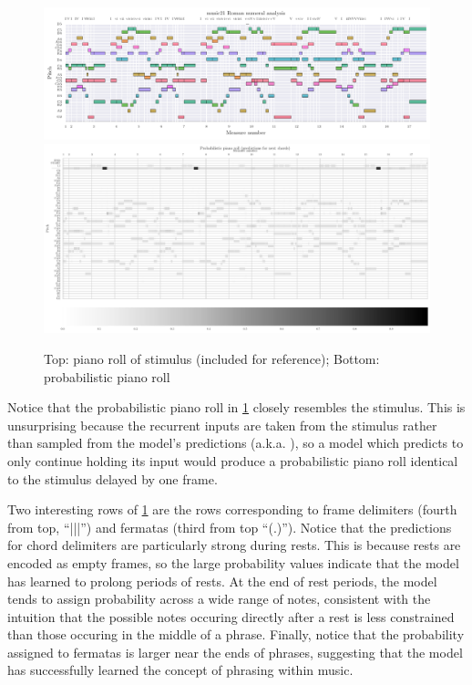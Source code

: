 \begin{figure}[tb]
    \centering
    ~~\includegraphics[width=0.99\linewidth]{model-analysis-input-piano-roll.pdf}
    \includegraphics[trim={0 0 0 1.4cm},clip,width=1.0\linewidth]{model-analysis-probabilistic-piano-roll.pdf}
    \caption{Top: piano roll of stimulus (included for reference); Bottom: probabilistic piano roll}
    \label{fig:model-analysis-probabilistic-piano-roll}
\end{figure}

Notice that the probabilistic piano roll in
\cref{fig:model-analysis-probabilistic-piano-roll} closely resembles the
stimulus. This is unsurprising because the recurrent inputs are taken from the
stimulus rather than sampled from the model's predictions (a.k.a.
\citep{williams1989learning}), so a model which predicts to only continue holding
its input would produce a probabilistic piano roll identical to the stimulus
delayed by one frame.

Two interesting rows of \cref{fig:model-analysis-probabilistic-piano-roll}
are the rows corresponding to frame delimiters (fourth from top, ``|||'') and
fermatas (third from top ``(.)''). Notice that the predictions for chord
delimiters are particularly strong during rests. This is because rests are
encoded as empty frames, so the large probability values indicate that the
model has learned to prolong periods of rests. At the end of rest periods, the
model tends to assign probability across a wide range of notes, consistent with
the intuition that the possible notes occuring directly after a rest is less
constrained than  those occuring in the middle of a
phrase. Finally, notice that the probability assigned to fermatas is larger
near the ends of phrases, suggesting that the model has successfully learned
the concept of phrasing within music.

